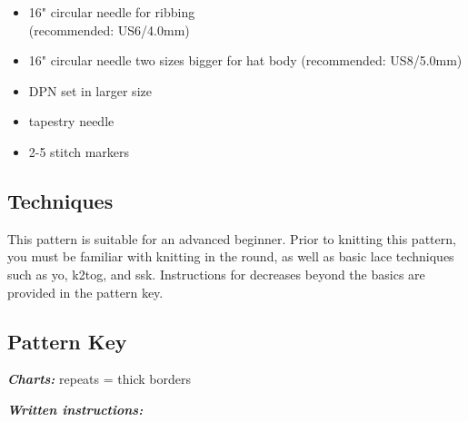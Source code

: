 \documentclass[12pt]{article}
\newcommand{\vocab}[1]{\emph{\textbf{#1}}} %
\begin{document}
\begin{titlingpage}
\begin{multicols}{2}
\begin{itemize}
\item 16" circular needle for ribbing \\ (recommended: US6/4.0mm) \vspace{-.5em}
\item 16" circular needle two sizes bigger for hat body (recommended: US8/5.0mm) \vspace{-.5em}
\item DPN set in larger size \vspace{-.5em}
\item tapestry needle\vspace{-.5em}
\item 2-5 stitch markers\vspace{-.5em}
\end{itemize}

\vfill
\columnbreak

\subsection*{Techniques}

This pattern is suitable for an advanced beginner. Prior to knitting this pattern, you must be familiar with knitting in the round, as well as basic lace techniques such as yo, k2tog, and ssk. Instructions for decreases beyond the basics are provided in the pattern key.

\subsection*{Pattern Key}

\vocab{Charts:} repeats = thick borders \chart{\!\underline{\overline{-}}\!}  

\vocab{Written instructions:} 


\end{multicols}
\end{titlingpage}
\end{document}
